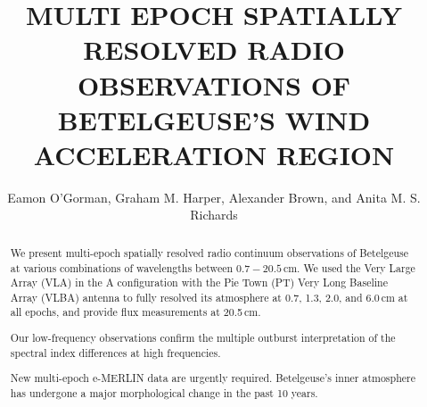 \documentclass[iop]{emulateapj}
\begin{document}
\title{MULTI EPOCH SPATIALLY RESOLVED RADIO OBSERVATIONS OF BETELGEUSE'S WIND ACCELERATION REGION}


\author{Eamon O'Gorman, Graham M. Harper, Alexander Brown, and Anita M. S. Richards}



\begin{abstract}
We present multi-epoch spatially resolved radio continuum observations of Betelgeuse at various combinations of wavelengths between $0.7-20.5$\,cm.  We used the Very Large Array (VLA) in the A configuration with the Pie Town (PT) Very Long Baseline Array (VLBA) antenna to fully resolved its atmosphere at 0.7, 1.3, 2.0, and 6.0\,cm at all epochs, and provide flux measurements at 20.5\,cm.

Our low-frequency observations confirm the multiple outburst interpretation of the spectral index differences at high frequencies.

 New multi-epoch e-MERLIN data are urgently required. Betelgeuse's inner atmosphere has undergone a major morphological change in the past 10 years.

\end{abstract}

\end{document}

